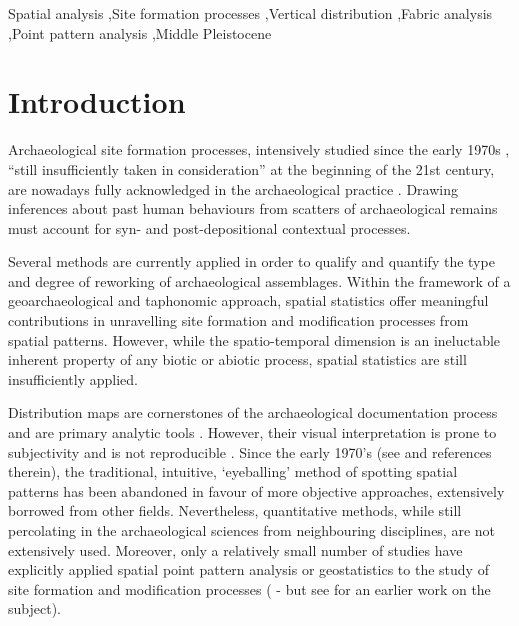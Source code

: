 \documentclass[preprint,authoryear,times]{elsarticle} %
\begin{document}
\begin{frontmatter}
  \begin{keyword}
    Spatial analysis \sep Site formation processes \sep Vertical distribution \sep Fabric analysis \sep Point pattern analysis \sep Middle Pleistocene
  \end{keyword}
  
\end{frontmatter}

\linenumbers

\section{Introduction}

Archaeological site formation processes, intensively studied since the early 1970s \citep[][among others]{Isaac1967,Schiffer1972,Schiffer1983,Schiffer1987,Shackley1978,Wood1978,Schick1984,Schick1986,Schick1987,Petraglia1987,Petraglia1994} %
, ``still insufficiently taken in consideration'' \citep{Texier2000} at the beginning of the 21st century, are nowadays fully acknowledged in the archaeological practice \citep[][among others]{Villa2004,Bailey2007,Brantingham2007,Malinsky-Buller2011,Vaquero2012,Bargallo2016}. %
Drawing inferences about past human behaviours from scatters of archaeological remains must account for syn- and post-depositional contextual processes.

Several methods are currently applied in order to qualify and quantify the type and degree of reworking of archaeological assemblages. Within the framework of a geoarchaeological and taphonomic approach, spatial statistics offer meaningful contributions in unravelling site formation and modification processes from spatial patterns. However, while the spatio-temporal dimension is an ineluctable inherent property of any biotic or abiotic process, spatial statistics are still insufficiently applied.


Distribution maps are cornerstones of the archaeological documentation process and are primary analytic tools %
. However, their visual interpretation is prone to subjectivity and is not reproducible \citep{Bevan2013a}. Since the early 1970's (see \cite{Hodder1976,Orton1982} and references therein), the traditional, intuitive, `eyeballing' method of spotting spatial patterns has been abandoned in favour of more objective approaches, extensively borrowed from other fields. Nevertheless, quantitative methods, while still percolating in the archaeological sciences from neighbouring disciplines, are not extensively used. Moreover, only a relatively small number of studies have explicitly applied spatial point pattern analysis or geostatistics to the study of site formation and modification processes (\cite{Lenoble2008,Dominguez-Rodrigo2014b,Dominguez-Rodrigo2014c,Dominguez-Rodrigo2017,Carrer2015,Giusti2016,Organista2017} - but see \cite{Hivernel1984} for an earlier work on the subject). %
\end{document}
